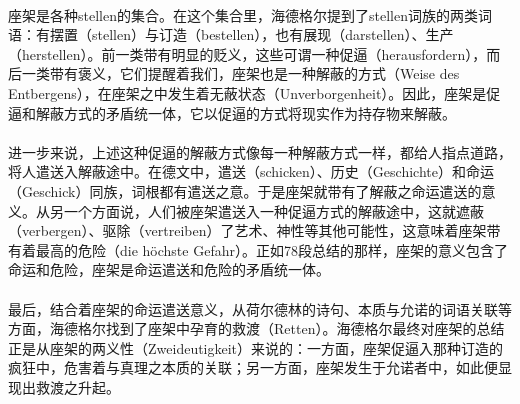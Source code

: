 \documentclass{article}
\begin{document}
		\paragraph{}
		座架是各种stellen的集合。在这个集合里，海德格尔提到了stellen词族的两类词语：有摆置（stellen）与订造（bestellen），也有展现（darstellen）、生产（herstellen）。前一类带有明显的贬义，这些可谓一种促逼（herausfordern），而后一类带有褒义，它们提醒着我们，座架也是一种解蔽的方式（Weise des Entbergens），在座架之中发生着无蔽状态（Unverborgenheit）。因此，座架是促逼和解蔽方式的矛盾统一体，它以促逼的方式将现实作为持存物来解蔽。
		\paragraph{}
		进一步来说，上述这种促逼的解蔽方式像每一种解蔽方式一样，都给人指点道路，将人遣送入解蔽途中。在德文中，遣送（schicken）、历史（Geschichte）和命运（Geschick）同族，词根都有遣送之意。于是座架就带有了解蔽之命运遣送的意义。从另一个方面说，人们被座架遣送入一种促逼方式的解蔽途中，这就遮蔽（verbergen）、驱除（vertreiben）了艺术、神性等其他可能性，这意味着座架带有着最高的危险（die höchste Gefahr）。正如78段总结的那样，座架的意义包含了命运和危险，座架是命运遣送和危险的矛盾统一体。
		\paragraph{}
		最后，结合着座架的命运遣送意义，从荷尔德林的诗句、本质与允诺的词语关联等方面，海德格尔找到了座架中孕育的救渡（Retten）。海德格尔最终对座架的总结正是从座架的两义性（Zweideutigkeit）来说的：一方面，座架促逼入那种订造的疯狂中，危害着与真理之本质的关联；另一方面，座架发生于允诺者中，如此便显现出救渡之升起。
\end{document}
